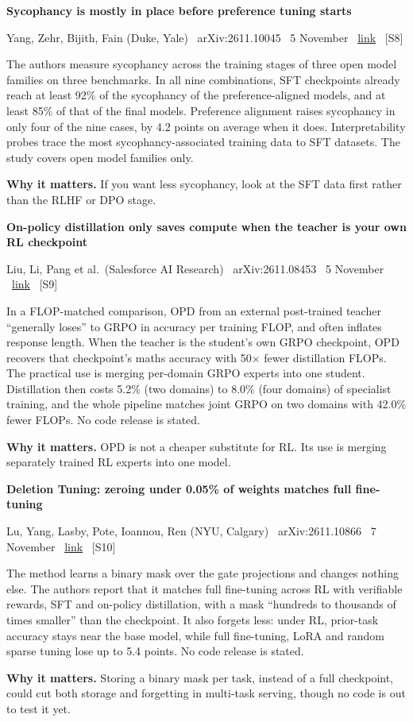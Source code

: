 \documentclass[11pt,a4paper]{article}
\newcommand{\entry}[4]{%
  \par\Needspace{7\baselineskip}\vspace{0.7em}%
  {\sffamily\bfseries\color{brandink}#1}\par
  {\footnotesize\color{brandgrey}#2 \textbullet\ \href{#3}{link} \textbullet\ \srcref{#4}}\par
  \vspace{0.15em}}
\newcommand{\why}[1]{\par{\small\textbf{Why it matters.} #1}\par}
\newcommand{\srcref}[1]{\textcolor{brandaccent}{[S#1]}}
\begin{document}
\entry{Sycophancy is mostly in place before preference tuning starts}{Yang, Zehr, Bijith, Fain (Duke, Yale) \textbullet\ arXiv:2611.10045 \textbullet\ 5 November}{https://arxiv.org/abs/2611.10045}{8}
The authors measure sycophancy across the training stages of three open model families on three benchmarks. In all nine combinations, SFT checkpoints already reach at least 92\% of the sycophancy of the preference-aligned models, and at least 85\% of that of the final models.
Preference alignment raises sycophancy in only four of the nine cases, by 4.2 points on average when it does. Interpretability probes trace the most sycophancy-associated training data to SFT datasets. The study covers open model families only.
\why{If you want less sycophancy, look at the SFT data first rather than the RLHF or DPO stage.}

\entry{On-policy distillation only saves compute when the teacher is your own RL checkpoint}{Liu, Li, Pang et al.\ (Salesforce AI Research) \textbullet\ arXiv:2611.08453 \textbullet\ 5 November}{https://arxiv.org/abs/2611.08453}{9}
In a FLOP-matched comparison, OPD from an external post-trained teacher ``generally loses'' to GRPO in accuracy per training FLOP, and often inflates response length. When the teacher is the student's own GRPO checkpoint, OPD recovers that checkpoint's maths accuracy with 50$\times$ fewer distillation FLOPs.
The practical use is merging per-domain GRPO experts into one student. Distillation then costs 5.2\% (two domains) to 8.0\% (four domains) of specialist training, and the whole pipeline matches joint GRPO on two domains with 42.0\% fewer FLOPs. No code release is stated.
\why{OPD is not a cheaper substitute for RL. Its use is merging separately trained RL experts into one model.}

\entry{Deletion Tuning: zeroing under 0.05\% of weights matches full fine-tuning}{Lu, Yang, Lasby, Pote, Ioannou, Ren (NYU, Calgary) \textbullet\ arXiv:2611.10866 \textbullet\ 7 November}{https://arxiv.org/abs/2611.10866}{10}
The method learns a binary mask over the gate projections and changes nothing else. The authors report that it matches full fine-tuning across RL with verifiable rewards, SFT and on-policy distillation, with a mask ``hundreds to thousands of times smaller'' than the checkpoint.
It also forgets less: under RL, prior-task accuracy stays near the base model, while full fine-tuning, LoRA and random sparse tuning lose up to 5.4 points. No code release is stated.
\why{Storing a binary mask per task, instead of a full checkpoint, could cut both storage and forgetting in multi-task serving, though no code is out to test it yet.}
\end{document}

